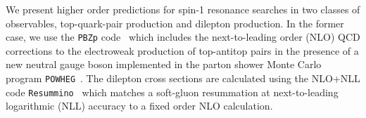 \subsubsection{}
%
%
%
%
%
%


We present higher order predictions for spin-1 resonance searches in two classes of observables,
top-quark-pair production and dilepton production.
In the former case, we use the {\tt PBZp} code~\cite{Bonciani:2015hgv} which includes the next-to-leading order (NLO)
QCD corrections to the electroweak production of top-antitop pairs in the presence of a new neutral gauge boson 
implemented in the parton shower Monte Carlo program {\tt POWHEG}~\cite{Frixione:2002ik,Frixione:2007vw,Alioli:2010xd}.
The dilepton cross sections are calculated using the NLO+NLL  code {\tt Resummino}~\cite{Jezo:2014wra} which matches
a soft-gluon resummation at next-to-leading logarithmic (NLL) accuracy to a fixed order NLO calculation.

